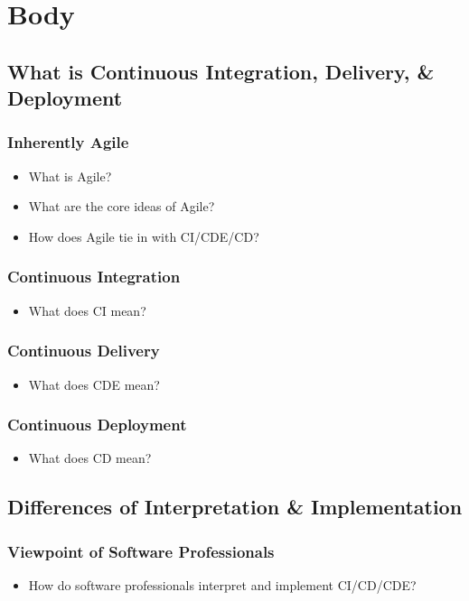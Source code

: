 \documentclass[11pt,a4paper]{article}
\begin{document}
\section{Body}
	\subsection{What is Continuous Integration, Delivery, \& Deployment}
		\subsubsection{Inherently Agile}
		\begin{itemize}[noitemsep]
			\item What is Agile? 
			\item What are the core ideas of Agile?
			\item How does Agile tie in with CI/CDE/CD?
		\end{itemize}
		\vspace{-7mm}
		\subsubsection{Continuous Integration}
		\begin{itemize}[noitemsep]
			\item What does CI mean?
		\end{itemize}
		\subsubsection{Continuous Delivery}
		\begin{itemize}[noitemsep]
			\item What does CDE mean?
		\end{itemize}
		\subsubsection{Continuous Deployment}
		\begin{itemize}[noitemsep]
			\item What does CD mean?
		\end{itemize}
		
	\subsection{Differences of Interpretation \& Implementation}
		\subsubsection{Viewpoint of Software Professionals}
		\begin{itemize}[noitemsep]
			\item How do software professionals interpret and implement CI/CD/CDE?
		\end{itemize}
\end{document}
